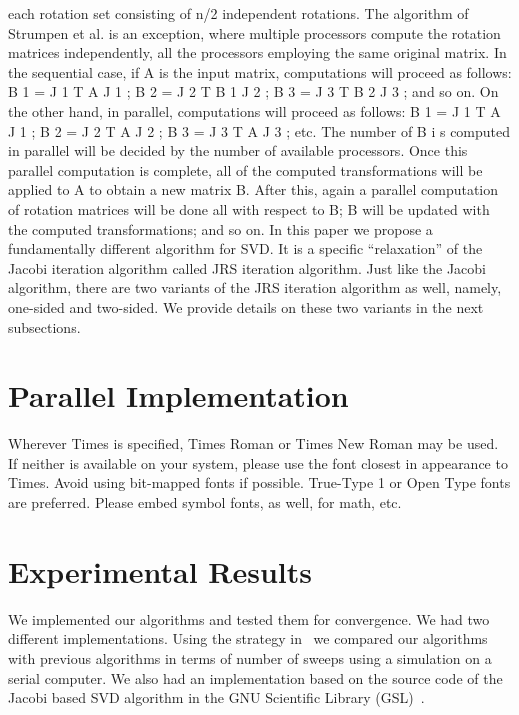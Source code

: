 \documentclass[10pt, conference, compsocconf]{IEEEtran}
\begin{document}
each rotation set consisting of n/2 independent rotations. The
algorithm of Strumpen et al. is an exception, where multiple
processors compute the rotation matrices independently, all
the processors employing the same original matrix. In the
sequential case, if A is the input matrix, computations will
proceed as follows: B 1 = J 1 T A J 1 ; B 2 = J 2 T B 1 J 2 ; B 3 =
J 3 T B 2 J 3 ; and so on. On the other hand, in parallel, computations
will proceed as follows: B 1 = J 1 T A J 1 ; B 2 = J 2 T A J 2 ; B 3 =
J 3 T A J 3 ; etc. The number of B i s computed in parallel will
be decided by the number of available processors. Once
this parallel computation is complete, all of the computed
transformations will be applied to A to obtain a new matrix
B. After this, again a parallel computation of rotation matrices
will be done all with respect to B; B will be updated with the
computed transformations; and so on.
In this paper we propose a fundamentally different algorithm
for SVD. It is a specific “relaxation” of the Jacobi iteration
algorithm called JRS iteration algorithm. Just like the Jacobi
algorithm, there are two variants of the JRS iteration algorithm
as well, namely, one-sided and two-sided. We provide details
on these two variants in the next subsections.


\section{Parallel Implementation}
Wherever Times is specified, Times Roman or Times New Roman may be used. If neither is available on your system, please use the font closest in appearance to Times. Avoid using bit-mapped fonts if possible. True-Type 1 or Open Type fonts are preferred. Please embed symbol fonts, as well, for math, etc.



\section{Experimental Results}

We implemented our algorithms and tested them for convergence. We had two different implementations. Using the strategy in~\cite{rajasekaran2008relaxation} we compared our algorithms with previous algorithms in terms of number of sweeps using a simulation on a serial computer. We also had an implementation based on the source code of the Jacobi based SVD algorithm in the GNU Scientific Library (GSL)~\cite{galassi1996gnu}.
\end{document}
